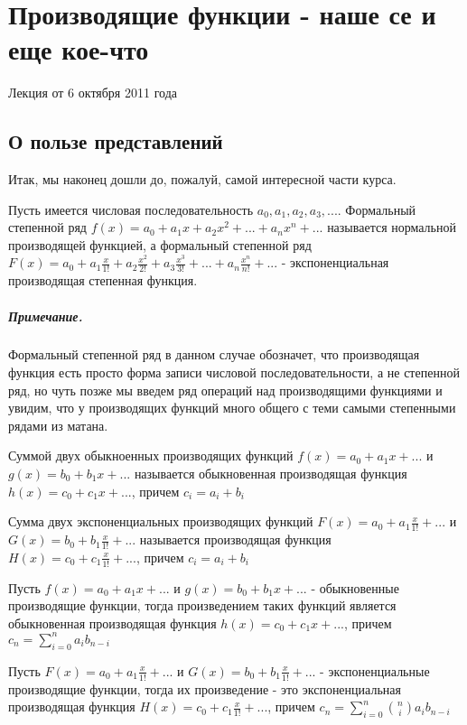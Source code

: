 \chapter{Производящие функции - наше се и еще кое-что}

Лекция от 6 октября 2011 года

\section{О пользе представлений}
Итак, мы наконец дошли до, пожалуй, самой интересной части курса.

\begin{Def}
Пусть имеется числовая последовательность $a_0, a_1, a_2, a_3, ...$. Формальный степенной ряд $f\left(x\right) = a_0 + a_1 x + a_2 x^2 + ... + a_n x^n + ...$ называется нормальной производящей функцией, а формальный степенной ряд $F\left(x\right) = a_0 + a_1 \frac{x}{1!} + a_2 \frac{x^2}{2!} + a_3 \frac{x^3}{3!} + ... + a_n \frac{x^n}{n!} + ...$ - экспоненциальная производящая степенная функция.
\end{Def}

\paragraph{Примечание.} Формальный степенной ряд в данном случае обозначет, что производящая функция есть просто форма записи числовой последовательности, а не степенной ряд, но чуть позже мы введем ряд операций над производящими функциями и увидим, что у производящих функций много общего с теми самыми степенными рядами из матана.

\begin{Def}
Суммой двух обыкноенных производящих функций $f\left(x\right) = a_0 + a_1 x + ...$ и $g\left(x\right) = b_0 + b_1 x + ...$ называется обыкновенная производящая функция $h\left(x\right) = c_0 + c_1 x + ...$, причем $c_i = a_i + b_i$

Сумма двух экспоненциальных производящих функций $F\left(x\right) = a_0 + a_1 \frac{x}{1!} + ...$ и $G\left(x\right) = b_0 + b_1 \frac{x}{1!} + ...$ называется производящая функция $H\left(x\right) = c_0 + c_1 \frac{x}{1!} + ...$, причем $c_i = a_i + b_i$
\end{Def}

\begin{Def}
Пусть $f\left(x\right) = a_0 + a_1 x + ... $ и $g\left(x\right) = b_0 + b_1 x + ...$ - обыкновенные производящие функции, тогда произведением таких функций является обыкновенная производящая функция $h\left(x\right) = c_0 + c_1 x + ...$, причем $c_n = \sum_{i=0}^n a_i b_{n-i}$

Пусть $F\left(x\right) = a_0 + a_1 \frac{x}{1!} + ...$ и $G\left(x\right) = b_0 + b_1 \frac{x}{1!} + ...$ - экспоненциальные производящие функции, тогда их произведение - это экспоненциальная производящая функция $H\left(x\right) = c_0 + c_1 \frac{x}{1!} + ...$, причем $c_n = \sum_{i=0}^n \binom{n}{i}a_i b_{n-i}$
\end{Def}

